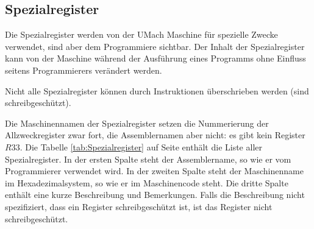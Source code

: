 \subsection{Spezialregister}
Die Spezialregister werden von der UMach Maschine für spezielle Zwecke
verwendet, sind aber dem Programmiere sichtbar. Der Inhalt der Spezialregister
kann von der Maschine während der Ausführung eines Programms ohne Einfluss
seitens Programmierers verändert werden.

Nicht alle Spezialregister können durch Instruktionen überschrieben werden
(sind schreibgeschützt).

Die Maschinennamen der Spezialregister setzen die Nummerierung der
Allzweckregister zwar fort, die Assemblernamen aber nicht: es gibt kein Register
$R33$.
Die Tabelle \ref{tab:Spezialregister} auf Seite \pageref{tab:Spezialregister}
enthält die Liste aller Spezialregister.  In der ersten
Spalte steht der Assemblername, so wie er vom Programmierer verwendet wird. In
der zweiten Spalte steht der Maschinenname im Hexadezimalsystem, so wie er im
Maschinencode steht.
Die dritte Spalte enthält eine kurze Beschreibung und Bemerkungen.
Falls die Beschreibung nicht spezifiziert, dass ein Register schreibgeschützt
ist, ist das Register nicht schreibgeschützt.

